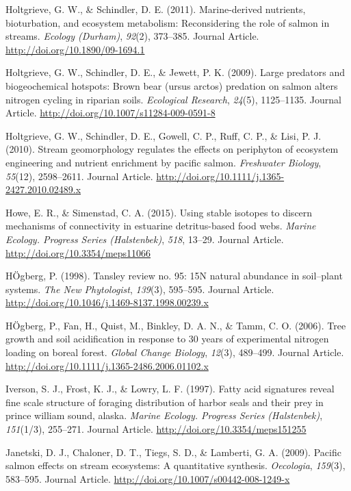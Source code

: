 \documentclass [11pt, proquest] {uwthesis}[2015/03/03]
\begin{document}
\hypertarget{ref-Holtgrieve2011}{}
Holtgrieve, G. W., \& Schindler, D. E. (2011). Marine-derived nutrients,
bioturbation, and ecosystem metabolism: Reconsidering the role of salmon
in streams. \emph{Ecology (Durham)}, \emph{92}(2), 373--385. Journal
Article. \url{http://doi.org/10.1890/09-1694.1}

\hypertarget{ref-Holtgrieve2009}{}
Holtgrieve, G. W., Schindler, D. E., \& Jewett, P. K. (2009). Large
predators and biogeochemical hotspots: Brown bear (ursus arctos)
predation on salmon alters nitrogen cycling in riparian soils.
\emph{Ecological Research}, \emph{24}(5), 1125--1135. Journal Article.
\url{http://doi.org/10.1007/s11284-009-0591-8}

\hypertarget{ref-Holtgrieve2010}{}
Holtgrieve, G. W., Schindler, D. E., Gowell, C. P., Ruff, C. P., \&
Lisi, P. J. (2010). Stream geomorphology regulates the effects on
periphyton of ecosystem engineering and nutrient enrichment by pacific
salmon. \emph{Freshwater Biology}, \emph{55}(12), 2598--2611. Journal
Article. \url{http://doi.org/10.1111/j.1365-2427.2010.02489.x}

\hypertarget{ref-Howe2015}{}
Howe, E. R., \& Simenstad, C. A. (2015). Using stable isotopes to
discern mechanisms of connectivity in estuarine detritus-based food
webs. \emph{Marine Ecology. Progress Series (Halstenbek)}, \emph{518},
13--29. Journal Article. \url{http://doi.org/10.3354/meps11066}

\hypertarget{ref-Hogberg1998}{}
HÖgberg, P. (1998). Tansley review no. 95: 15N natural abundance in
soil--plant systems. \emph{The New Phytologist}, \emph{139}(3),
595--595. Journal Article.
\url{http://doi.org/10.1046/j.1469-8137.1998.00239.x}

\hypertarget{ref-Hogberg2006}{}
HÖgberg, P., Fan, H., Quist, M., Binkley, D. A. N., \& Tamm, C. O.
(2006). Tree growth and soil acidification in response to 30 years of
experimental nitrogen loading on boreal forest. \emph{Global Change
Biology}, \emph{12}(3), 489--499. Journal Article.
\url{http://doi.org/10.1111/j.1365-2486.2006.01102.x}

\hypertarget{ref-Iverson1997}{}
Iverson, S. J., Frost, K. J., \& Lowry, L. F. (1997). Fatty acid
signatures reveal fine scale structure of foraging distribution of
harbor seals and their prey in prince william sound, alaska.
\emph{Marine Ecology. Progress Series (Halstenbek)}, \emph{151}(1/3),
255--271. Journal Article. \url{http://doi.org/10.3354/meps151255}

\hypertarget{ref-Janetski2009}{}
Janetski, D. J., Chaloner, D. T., Tiegs, S. D., \& Lamberti, G. A.
(2009). Pacific salmon effects on stream ecosystems: A quantitative
synthesis. \emph{Oecologia}, \emph{159}(3), 583--595. Journal Article.
\url{http://doi.org/10.1007/s00442-008-1249-x}
\end{document}
